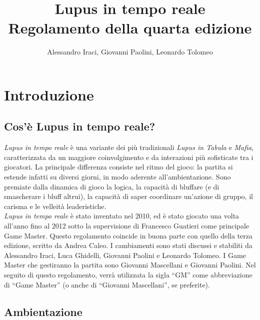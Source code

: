 \documentclass[a4paper,10pt]{article}
\title{Lupus in tempo reale\\ Regolamento della quarta edizione}
\author{Alessandro Iraci, Giovanni Paolini, Leonardo Tolomeo}
\begin{document}
\maketitle


\section{Introduzione}

\subsection{Cos'è Lupus in tempo reale?}

\emph{Lupus in tempo reale} è una variante dei più tradizionali \emph{Lupus in
Tabula} e \emph{Mafia}, caratterizzata da un maggiore coinvolgimento e da
interazioni più sofisticate tra i giocatori.
La principale differenza consiste nel ritmo del gioco: la partita si estende
infatti su diversi giorni, in modo aderente all'ambientazione.
Sono premiate dalla dinamica di gioco la logica, la capacità di bluffare (e di
smascherare i bluff altrui), la capacità di saper coordinare un’azione di
gruppo, il carisma e le velleità leaderistiche.
\\
\emph{Lupus in tempo reale} è stato inventato nel 2010, ed è stato giocato una
volta all'anno fino al 2012 sotto la supervisione di Francesco Guatieri come
principale Game Master.
Questo regolamento coincide in buona parte con quello della terza edizione,
scritto da Andrea Caleo.
I cambiamenti sono stati discussi e stabiliti da Alessandro Iraci, Luca
Ghidelli, Giovanni Paolini e Leonardo Tolomeo.
I Game Master che gestiranno la partita sono Giovanni Mascellani e Giovanni
Paolini.
Nel seguito di questo regolamento, verrà utilizzata la sigla ``GM'' come
abbreviazione di ``Game Master'' (o anche di ``Giovanni Mascellani'', se
preferite).

\subsection{Ambientazione}
\end{document}
